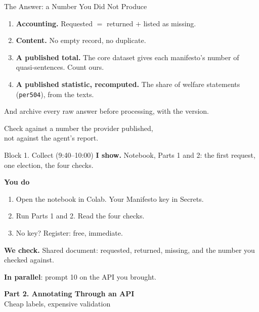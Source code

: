 \documentclass[svgnames,x11names,dvipsnames]{beamer}
\newcommand{\chg}[1]{{\bfseries #1}}
\renewcommand{\chg}[1]{#1}
\newcommand{\sectionslide}[2]{%
\begin{frame}[plain]
  \centering
  \vfill
  {\LARGE \textbf{\textcolor{titleblue}{#1}}}\\[0.4cm]
  {#2}
  \vfill
\end{frame}}
\begin{document}
\begin{frame}{The Answer: a Number You Did Not Produce}
\small
\begin{enumerate}
    \setlength{\itemsep}{6pt}
    \item \textbf{Accounting.} Requested $=$ returned $+$ listed as missing.
    \item \textbf{Content.} No empty record, no duplicate.
    \item \textbf{A published total.} The core dataset gives each manifesto's number of quasi-sentences. Count ours.
    \item \textbf{A published statistic, recomputed.} The share of welfare statements (\texttt{per504}), from the texts.
\end{enumerate}

\vspace{0.4cm}
And archive every raw answer before processing, with the version.

\vspace{0.5cm}
\centering
\alert{Check against a number the provider published,\\ not against the agent's report.}
\end{frame}

\begin{frame}{Block 1. Collect \chg{(9:40--10:00)}}
\small
\textbf{I show.} Notebook, Parts 1 and 2: the first request, one election, the four checks.

\vspace{0.4cm}
\textbf{You do}
\begin{enumerate}
    \setlength{\itemsep}{4pt}
    \item Open the notebook in Colab. Your Manifesto key in Secrets.
    \item Run Parts 1 and 2. Read the four checks.
    \item No key? Register: free, immediate.
\end{enumerate}

\vspace{0.4cm}
\textbf{We check.} Shared document: requested, returned, missing, and the number you checked against.

\vspace{0.4cm}
\textbf{In parallel}: prompt 10 on the API you brought.
\end{frame}

\sectionslide{Part 2. Annotating Through an API}{Cheap labels, expensive validation}
\end{document}
